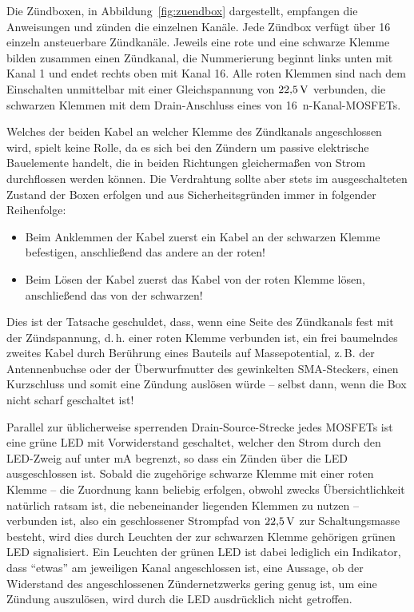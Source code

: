 \documentclass[pdftex, parskip, numbers=noenddot, toc=listof]{scrbook}
\begin{document}
	Die Zündboxen, in Abbildung~\ref{fig:zuendbox} dargestellt, empfangen die Anweisungen und zünden die einzelnen Kanäle. Jede Zündbox verfügt über 16 einzeln ansteuerbare Zündkanäle. Jeweils eine rote und eine schwarze Klemme bilden zusammen einen Zündkanal, die Nummerierung beginnt links unten mit Kanal 1 und endet rechts oben mit Kanal 16. Alle roten Klemmen sind nach dem Einschalten unmittelbar mit einer Gleichspannung von $\unit[22{,}5]{V}$ verbunden, die schwarzen Klemmen mit dem Drain-Anschluss eines von 16~n-Kanal-MOSFETs.

	Welches der beiden Kabel an welcher Klemme des Zündkanals angeschlossen wird, spielt keine Rolle, da es sich bei den Zündern um passive elektrische Bauelemente handelt, die in beiden Richtungen gleichermaßen von Strom durchflossen werden können. Die Verdrahtung sollte aber stets im ausgeschalteten Zustand der Boxen erfolgen und aus Sicherheitsgründen immer in folgender Reihenfolge:
	\begin{itemize}
		\item Beim Anklemmen der Kabel zuerst ein Kabel an der schwarzen Klemme befestigen, anschließend das andere an der roten!
		\item Beim Lösen der Kabel zuerst das Kabel von der roten Klemme lösen, anschließend das von der schwarzen!
	\end{itemize}
	Dies ist der Tatsache geschuldet, dass, wenn eine Seite des Zündkanals fest mit der Zündspannung, d.\,h. einer roten Klemme verbunden ist, ein frei baumelndes zweites Kabel durch Berührung eines Bauteils auf Massepotential, z.\,B. der Antennenbuchse oder der Überwurfmutter des gewinkelten SMA-Steckers, einen Kurzschluss und somit eine Zündung auslösen würde -- selbst dann, wenn die Box nicht scharf geschaltet ist!

	Parallel zur üblicherweise sperrenden Drain-Source-Strecke jedes MOSFETs ist eine grüne LED mit Vorwiderstand geschaltet, welcher den Strom durch den LED-Zweig auf unter \unit[5]{mA} begrenzt, so dass ein Zünden über die LED ausgeschlossen ist. Sobald die zugehörige schwarze Klemme mit einer roten Klemme -- die Zuordnung kann beliebig erfolgen, obwohl zwecks Übersichtlichkeit natürlich ratsam ist, die nebeneinander liegenden Klemmen zu nutzen -- verbunden ist, also ein geschlossener Strompfad von $\unit[22{,}5]{V}$ zur Schaltungsmasse besteht, wird dies durch Leuchten der zur schwarzen Klemme gehörigen grünen LED signalisiert. Ein Leuchten der grünen LED ist dabei lediglich ein Indikator, dass \enquote{etwas} am jeweiligen Kanal angeschlossen ist, eine Aussage, ob der Widerstand des angeschlossenen Zündernetzwerks gering genug ist, um eine Zündung auszulösen, wird durch die LED ausdrücklich nicht getroffen.
\end{document}
